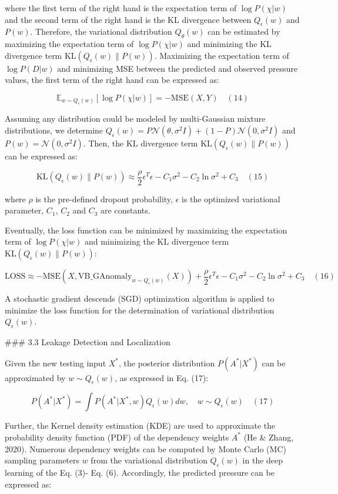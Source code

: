 where the first term of the right hand is the expectation term of $\log P(\chi|w)$ and the second term of the right hand is the KL divergence between $Q_\epsilon(w)$ and $P(w)$. Therefore, the variational distribution $Q_\theta(w)$ can be estimated by maximizing the expectation term of $\log P(\chi|w)$ and minimizing the KL divergence term $\mathrm{KL}(Q_\epsilon(w) \parallel P(w))$. Maximizing the expectation term of $\log P(D|w)$ and minimizing MSE between the predicted and observed pressure values, the first term of the right hand can be expressed as:

$$
\mathbb{E}_{w \sim Q_\epsilon(w)}[\log P(\chi|w)] = -\mathrm{MSE}(X,Y) \quad (14)
$$

Assuming any distribution could be modeled by multi-Gaussian mixture distributions, we determine $Q_\epsilon(w) = P\mathcal{N}(\theta,\sigma^2I) + (1 - P)\mathcal{N}(0,\sigma^2I)$ and $P(w) = \mathcal{N}(0,\sigma^2I)$. Then, the KL divergence term $\mathrm{KL}(Q_\epsilon(w) \parallel P(w))$ can be expressed as:

$$
\mathrm{KL}(Q_\epsilon(w) \parallel P(w)) \approx \frac{\rho}{2} \epsilon^T\epsilon - C_1\sigma^2 - C_2\ln \sigma^2 + C_3 \quad (15)
$$

where $\rho$ is the pre-defined dropout probability, $\epsilon$ is the optimized variational parameter, $C_1$, $C_2$ and $C_3$ are constants.

Eventually, the loss function can be minimized by maximizing the expectation term of $\log P(\chi|w)$ and minimizing the KL divergence term $\mathrm{KL}(Q_\epsilon(w) \parallel P(w))$:

$$
\mathrm{LOSS} \approx -\mathrm{MSE}(X,\mathrm{VB\_GAnomaly}_{w \sim Q_\epsilon(w)}(X)) + \frac{\rho}{2} \epsilon^T\epsilon - C_1\sigma^2 - C_2\ln \sigma^2 + C_3  \quad (16)
$$

A stochastic gradient descends (SGD) optimization algorithm is applied to minimize the loss function for the determination of variational distribution $Q_\epsilon(w)$.

### 3.3 Leakage Detection and Localization

Given the new testing input $X^*$, the posterior distribution $P(A^*|X^*)$ can be approximated by $w \sim Q_\epsilon(w)$, as expressed in Eq. (17):

$$
P(A^*|X^*) = \int P(A^*|X^*,w)Q_\epsilon(w)dw, \quad w \sim Q_\epsilon(w) \quad (17)
$$

Further, the Kernel density estimation (KDE) are used to approximate the probability density function (PDF) of the dependency weights $A^*$ (He & Zhang, 2020). Numerous dependency weights can be computed by Monte Carlo (MC) sampling parameters $w$ from the variational distribution $Q_\epsilon(w)$ in the deep learning of the Eq. (3)- Eq. (6). Accordingly, the predicted pressure can be expressed as:

